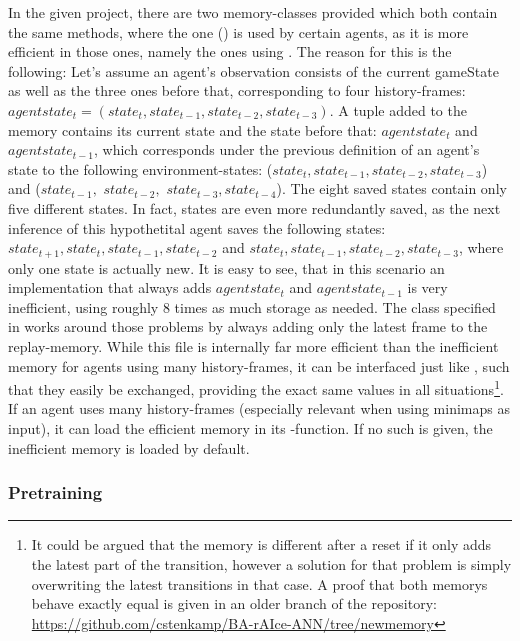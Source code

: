 In the given project, there are two memory-classes provided which both contain the same methods, where the one () is used by certain agents, as it is more efficient in those ones, namely the ones using . 
The reason for this is the following: 
Let's assume an agent's observation consists of the current gameState as well as the three ones before that, corresponding to four history-frames: $agentstate_t = (state_t, state_{t-1}, state_{t-2}, state_{t-3})$. A tuple added to the memory contains its current state and the state before that: $agentstate_t$ and $agentstate_{t-1}$, which corresponds under the previous definition of an agent's state to the following environment-states: ($state_t, state_{t-1}, state_{t-2}, state_{t-3}$) and ($state_{t-1}, $ $state_{t-2},$ $ state_{t-3}, state_{t-4}$). The eight saved states contain only five different states. In fact, states are even more redundantly saved, as the next inference of this hypothetital agent saves the following states: 
$state_{t+1}, state_{t}, state_{t-1}, state_{t-2}$ and $state_{t}, state_{t-1}, state_{t-2}, state_{t-3}$, where only one state is actually new. It is easy to see, that in this scenario an implementation that always adds $agentstate_t$ and $agentstate_{t-1}$ is very inefficient, using roughly 8 times as much storage as needed. The class specified in  works around those problems by always adding only the latest frame to the replay-memory. While this file is internally far more efficient than the inefficient memory for agents using many history-frames, it can be interfaced just like , such that they easily be exchanged, providing the exact same values in all situations\footnote{It could be argued that the memory is different after a reset if it only adds the latest part of the transition, however a solution for that problem is simply overwriting the latest transitions in that case. A proof that both memorys behave exactly equal is given in an older branch of the repository: \url{https://github.com/cstenkamp/BA-rAIce-ANN/tree/newmemory}}.
If an agent uses many history-frames (especially relevant when using minimaps as input), it can load the efficient memory in its -function. If no such is given, the inefficient memory is loaded by default. 

\subsubsection{Pretraining}

